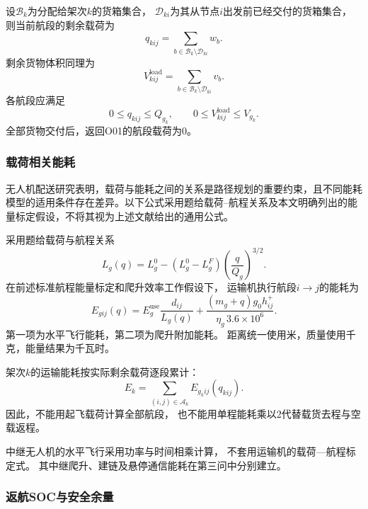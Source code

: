 \documentclass[bwprint]{gmcmthesis}
\begin{document}
设$\mathcal{B}_k$为分配给架次$k$的货箱集合，
$\mathcal{D}_{ki}$为其从节点$i$出发前已经交付的货箱集合，
则当前航段的剩余载荷为
\begin{equation}
    q_{kij}
    =
    \sum_{b\in\mathcal{B}_k\setminus\mathcal{D}_{ki}}w_b.
\end{equation}
剩余货物体积同理为
\begin{equation}
    V_{kij}^{\mathrm{load}}
    =
    \sum_{b\in\mathcal{B}_k\setminus\mathcal{D}_{ki}}v_b.
\end{equation}
各航段应满足
\begin{equation}
    0\leq q_{kij}\leq Q_{g_k},
    \qquad
    0\leq V_{kij}^{\mathrm{load}}\leq V_{g_k}.
\end{equation}
全部货物交付后，返回O01的航段载荷为0。

\subsubsection{载荷相关能耗}
无人机配送研究表明，载荷与能耗之间的关系是路径规划的重要约束，且不同能耗模型的适用条件存在差异\cite{dorling2017,zhang2021}。以下公式采用题给载荷--航程关系及本文明确列出的能量标定假设，不将其视为上述文献给出的通用公式。


采用题给载荷与航程关系
\begin{equation}
    L_g(q)
    =
    L_g^0-
    (L_g^0-L_g^F)
    \left(\frac{q}{Q_g}\right)^{3/2}.
\end{equation}
在前述标准航程能量标定和爬升效率工作假设下，
运输机执行航段$i\to j$的能耗为
\begin{equation}
    E_{gij}(q)
    =
    E_g^{\mathrm{use}}
    \frac{d_{ij}}{L_g(q)}
    +
    \frac{(m_g+q)g_0h_{ij}^{+}}
    {\eta_g\,3.6\times10^{6}}.
\end{equation}
第一项为水平飞行能耗，第二项为爬升附加能耗。
距离统一使用米，质量使用千克，能量结果为千瓦时。

架次$k$的运输能耗按实际剩余载荷逐段累计：
\begin{equation}
    E_k
    =
    \sum_{(i,j)\in\mathcal{A}_k}
    E_{g_kij}(q_{kij}).
\end{equation}
因此，不能用起飞载荷计算全部航段，
也不能用单程能耗乘以2代替载货去程与空载返程。

中继无人机的水平飞行采用功率与时间相乘计算，
不套用运输机的载荷—航程标定式。
其中继爬升、建链及悬停通信能耗在第三问中分别建立。

\subsubsection{返航SOC与安全余量}
\end{document}
